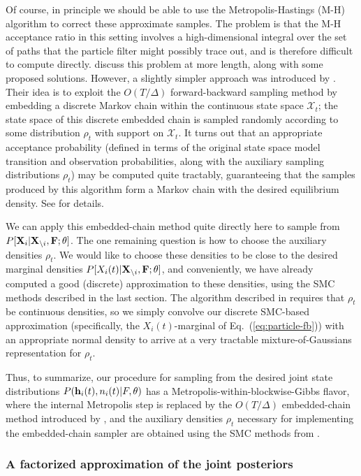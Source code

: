 Of course, in principle we should be able to use the Metropolis-Hastings (M-H) algorithm to correct these approximate samples. The problem is that the M-H acceptance ratio in this setting involves a high-dimensional integral over the set of paths that the particle filter might possibly trace out, and is therefore difficult to compute directly. \cite{Andrieu2007} discuss this problem at more length, along with some proposed solutions. However, a slightly simpler approach was introduced by \cite{NBR03}. Their idea is to exploit the $O(T/\Delta)$ forward-backward sampling method by embedding a discrete Markov chain within the continuous state space $\mathcal{X}_t$; the state space of this discrete embedded chain is sampled randomly according to some distribution $\rho_t$ with support on $\mathcal{X}_t$. It turns out that an appropriate acceptance probability (defined in terms of the original state space model transition and observation probabilities, along with the auxiliary sampling distributions $\rho_t$) may be computed quite tractably, guaranteeing that the samples produced by this algorithm form a Markov chain with the desired equilibrium density. See \cite{NBR03} for details.

We can apply this embedded-chain method quite directly here to sample
from $P[{\bf X}_i | {\bf X}_{\backslash i}, {\bf F}; \mathbf{\theta}]$. The one remaining question is
how to choose the auxiliary densities $\rho_t$. We would like to
choose these densities to be close to the desired marginal densities
$P[X_i(t) | {\bf X}_{\backslash i}, {\bf F}; \mathbf{\theta}]$, and conveniently, we have already
computed a good (discrete) approximation to these densities, using the
SMC methods described in the last section. The algorithm described in
\cite{NBR03} requires that $\rho_t$ be continuous densities, so we
simply convolve our discrete SMC-based approximation (specifically,
the $X_i(t)$-marginal of Eq.~(\ref{eq:particle-fb})) with an
appropriate normal density to arrive at a very tractable
mixture-of-Gaussians representation for $\rho_t$.

Thus, to summarize, our procedure for sampling from the desired joint
state distributions $P(\mathbf{h}_i(t),n_i(t) | F,\theta)$ has a
Metropolis-within-blockwise-Gibbs flavor, where the internal
Metropolis step is replaced by the $O(T/\Delta)$ embedded-chain method
introduced by \cite{NBR03}, and the auxiliary densities $\rho_t$
necessary for implementing the embedded-chain sampler are obtained
using the SMC methods from \cite{Vogelstein2009}.

\subsubsection{A factorized approximation of the joint posteriors}
\label{sec:cheaper-high-snr}

